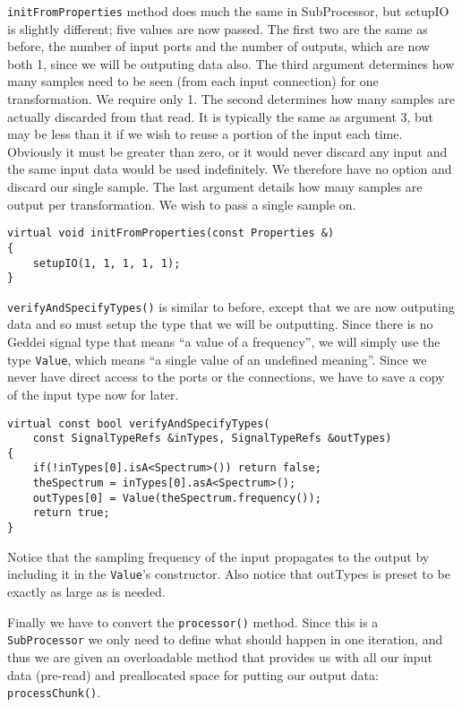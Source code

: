 \texttt{initFromProperties} method does much the same in SubProcessor, but setupIO is slightly different; five values are now passed. The first two are the same as before, the number of input ports and the number of outputs, which are now both 1, since we will be outputing data also. The third argument determines how many samples need to be seen (from each input connection) for one transformation. We require only 1. The second determines how many samples are actually discarded from that read. It is typically the same as argument 3, but may be less than it if we wish to reuse a portion of the input each time. Obviously it must be greater than zero, or it would never discard any input and the same input data would be used indefinitely. We therefore have no option and discard our single sample. The last argument details how many samples are output per transformation. We wish to pass a single sample on.

\begin{verbatim}
virtual void initFromProperties(const Properties &)
{
    setupIO(1, 1, 1, 1, 1);
}
\end{verbatim}

\texttt{verifyAndSpecifyTypes()} is similar to before, except that we are now outputing data and so must setup the type that we will be outputting. Since there is no Geddei signal type that means ``a value of a frequency'', we will simply use the type \texttt{Value}, which means ``a single value of an undefined meaning''. Since we never have direct access to the ports or the connections, we have to save a copy of the input type now for later.

\begin{verbatim}
virtual const bool verifyAndSpecifyTypes(
    const SignalTypeRefs &inTypes, SignalTypeRefs &outTypes)
{
    if(!inTypes[0].isA<Spectrum>()) return false;
    theSpectrum = inTypes[0].asA<Spectrum>();
    outTypes[0] = Value(theSpectrum.frequency());
    return true;
}
\end{verbatim}

Notice that the sampling frequency of the input propagates to the output by including it in the \texttt{Value}'s constructor. Also notice that outTypes is preset to be exactly as large as is needed.

Finally we have to convert the \texttt{processor()} method. Since this is a \texttt{SubProcessor} we only need to define what should happen in one iteration, and thus we are given an overloadable method that provides us with all our input data (pre-read) and preallocated space for putting our output data: \texttt{processChunk()}.

